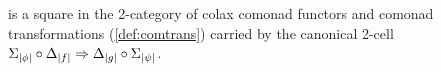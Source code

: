 \documentclass[11pt, oneside, article]{memoir}
\theoremstyle{plain}
\theoremstyle{definition}
\theoremstyle{remark}
\newenvironment{remark}
{\renewcommand\qedsymbol{$\lrcorner$}%
  \pushQED{\qed}\myremark}
{\popQED\endmyremark}
\DeclareMathOperator{\ophelper}{op}
\DeclarePairedDelimiter{\abs}{\lvert}{\rvert}
\newcommand{\op}{^{\ophelper}}
\newcommand{\namedcat}[1]{\mathbf{#1}}
\newcommand{\cat}[1]{\mathbf{#1}}
\newcommand{\Set}{\namedcat{Set}}
\newcommand{\CAT}{\namedcat{CAT}}
\newcommand{\Cmd}{\mathbb{C}\namedcat{md}}
\newcommand{\CmdId}{\Cmd_=}
\newcommand{\pts}[1]{{\abs{#1}}}
\newcommand{\one}[1]{\pts{#1}}
\newcommand{\leindex}[1]{\Sigma_{#1}}
\newcommand{\reindex}[1]{\Delta_{#1}}
\newcommand{\xX}{X}
\newcommand{\bS}{\cat{S}}
\begin{document}
\begin{remark}
\[  \]
  is a square in the 2-category of colax comonad functors and comonad
  transformations (\cref{def:comtrans}) carried by the canonical
  2-cell
  $\leindex{\one{\phi}} \circ \reindex{\one{f}} \Rightarrow
  \reindex{\one{g}} \circ \leindex{\one{\psi}}$.
\end{remark}

\end{document}
